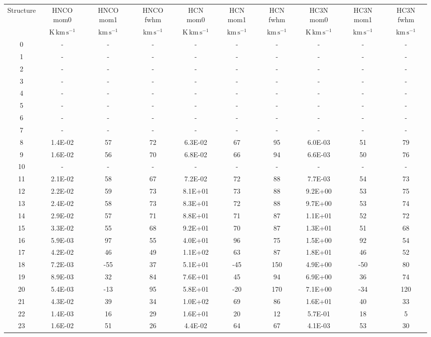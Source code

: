 \begin{tabular}{cccccccccc}
Structure & HNCO mom0 & HNCO mom1 & HNCO fwhm & HCN mom0 & HCN mom1 & HCN fwhm & HC3N mom0 & HC3N mom1 & HC3N fwhm \\
& $\mathrm{K\,km\,s^{-1}}$ & $\mathrm{km\,s^{-1}}$ & $\mathrm{km\,s^{-1}}$ & $\mathrm{K\,km\,s^{-1}}$ & $\mathrm{km\,s^{-1}}$ & $\mathrm{km\,s^{-1}}$ & $\mathrm{K\,km\,s^{-1}}$ & $\mathrm{km\,s^{-1}}$ & $\mathrm{km\,s^{-1}}$ \\
0 &-&-&-&-&-&-&-&-&-\\
1 &-&-&-&-&-&-&-&-&-\\
2 &-&-&-&-&-&-&-&-&-\\
3 &-&-&-&-&-&-&-&-&-\\
4 &-&-&-&-&-&-&-&-&-\\
5 &-&-&-&-&-&-&-&-&-\\
6 &-&-&-&-&-&-&-&-&-\\
7 &-&-&-&-&-&-&-&-&-\\
8 & 1.4E-02 & 57 & 72 & 6.3E-02 & 67 & 95 & 6.0E-03 & 51 & 79 \\
9 & 1.6E-02 & 56 & 70 & 6.8E-02 & 66 & 94 & 6.6E-03 & 50 & 76 \\
10 &-&-&-&-&-&-&-&-&-\\
11 & 2.1E-02 & 58 & 67 & 7.2E-02 & 72 & 88 & 7.7E-03 & 54 & 73 \\
12 & 2.2E-02 & 59 & 73 & 8.1E+01 & 73 & 88 & 9.2E+00 & 53 & 75 \\
13 & 2.4E-02 & 58 & 73 & 8.3E+01 & 72 & 88 & 9.7E+00 & 53 & 74 \\
14 & 2.9E-02 & 57 & 71 & 8.8E+01 & 71 & 87 & 1.1E+01 & 52 & 72 \\
15 & 3.3E-02 & 55 & 68 & 9.2E+01 & 70 & 87 & 1.3E+01 & 51 & 68 \\
16 & 5.9E-03 & 97 & 55 & 4.0E+01 & 96 & 75 & 1.5E+00 & 92 & 54 \\
17 & 4.2E-02 & 46 & 49 & 1.1E+02 & 63 & 87 & 1.8E+01 & 46 & 52 \\
18 & 7.2E-03 & -55 & 37 & 5.1E+01 & -45 & 150 & 4.9E+00 & -50 & 80 \\
19 & 8.9E-03 & 32 & 84 & 7.6E+01 & 45 & 94 & 6.9E+00 & 36 & 74 \\
20 & 5.4E-03 & -13 & 95 & 5.8E+01 & -20 & 170 & 7.1E+00 & -34 & 120 \\
21 & 4.3E-02 & 39 & 34 & 1.0E+02 & 69 & 86 & 1.6E+01 & 40 & 33 \\
22 & 1.4E-03 & 16 & 29 & 1.6E+01 & 20 & 12 & 5.7E-01 & 18 & 5 \\
23 & 1.6E-02 & 51 & 26 & 4.4E-02 & 64 & 67 & 4.1E-03 & 53 & 30 \\

\end{tabular}
